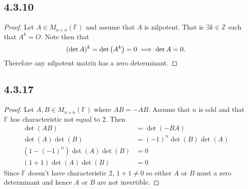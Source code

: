 \documentclass[12pt,titlepage]{extarticle}
\begin{document}
\subsection*{4.3.10}
\begin{proof}
    Let $A \in M_{n \times n}(\mathbb{F})$ and assume that $A$ is nilpotent. That is $\exists k \in \mathbb{Z}$ such that $A^k = O$. Note then that
    \[
        (\det A)^k = \det \qty(A^k) = 0 \implies \det A = 0
    .\]
    Therefore any nilpotent matrix has a zero determinant.
\end{proof}

\subsection*{4.3.17}
\begin{proof}
    Let $A, B \in M_{n \times n}(\mathbb{F})$ where $AB = -AB$. Assume that $n$ is odd and that $\mathbb{F}$ has characteristic not equal to $2$. Then
    \begin{align*}
        \det(AB) &= \det(-BA) \\
        \det(A)\det(B) &= (-1)^n\det(B)\det(A) \\
        (1 - (-1)^n)\det(A)\det(B) &= 0 \\
        (1 + 1)\det(A)\det(B) &= 0
    \end{align*}
    Since $\mathbb{F}$ doesn't have characteristic 2, $1 + 1 \neq 0$ so either $A$ or $B$ must a zero determinant and hence $A$ or $B$ are not invertible.
\end{proof}
\end{document}
